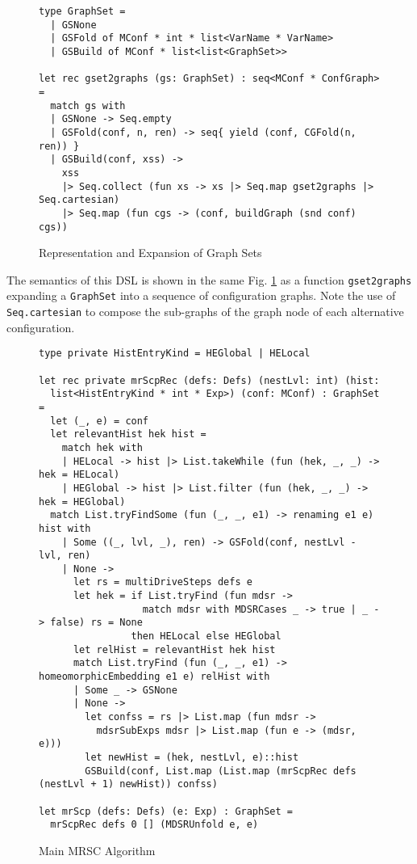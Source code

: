 \documentclass[submission,copyright,creativecommons]{eptcs}
\begin{document}
\begin{figure}
\begin{lstlisting}
type GraphSet =
  | GSNone
  | GSFold of MConf * int * list<VarName * VarName>
  | GSBuild of MConf * list<list<GraphSet>>

let rec gset2graphs (gs: GraphSet) : seq<MConf * ConfGraph> =
  match gs with
  | GSNone -> Seq.empty
  | GSFold(conf, n, ren) -> seq{ yield (conf, CGFold(n, ren)) }
  | GSBuild(conf, xss) ->
    xss
    |> Seq.collect (fun xs -> xs |> Seq.map gset2graphs |> Seq.cartesian)
    |> Seq.map (fun cgs -> (conf, buildGraph (snd conf) cgs))
\end{lstlisting}
\caption{Representation and Expansion of Graph Sets}
\label{fig:GraphSet}
\end{figure}

The semantics of this DSL is shown in the same Fig. \ref{fig:GraphSet} as
a function \verb|gset2graphs| expanding a \verb|GraphSet| into a sequence 
of configuration graphs.
Note the use of \verb|Seq.cartesian| to compose the sub-graphs of 
the graph node of each alternative configuration.

\begin{figure}
\begin{lstlisting}
type private HistEntryKind = HEGlobal | HELocal

let rec private mrScpRec (defs: Defs) (nestLvl: int) (hist: 
  list<HistEntryKind * int * Exp>) (conf: MConf) : GraphSet =
  let (_, e) = conf
  let relevantHist hek hist =
    match hek with
    | HELocal -> hist |> List.takeWhile (fun (hek, _, _) -> hek = HELocal)
    | HEGlobal -> hist |> List.filter (fun (hek, _, _) -> hek = HEGlobal)
  match List.tryFindSome (fun (_, _, e1) -> renaming e1 e) hist with
    | Some ((_, lvl, _), ren) -> GSFold(conf, nestLvl - lvl, ren)
    | None ->
      let rs = multiDriveSteps defs e
      let hek = if List.tryFind (fun mdsr -> 
                  match mdsr with MDSRCases _ -> true | _ -> false) rs = None
                then HELocal else HEGlobal
      let relHist = relevantHist hek hist
      match List.tryFind (fun (_, _, e1) -> homeomorphicEmbedding e1 e) relHist with
      | Some _ -> GSNone
      | None ->
        let confss = rs |> List.map (fun mdsr -> 
          mdsrSubExps mdsr |> List.map (fun e -> (mdsr, e)))
        let newHist = (hek, nestLvl, e)::hist
        GSBuild(conf, List.map (List.map (mrScpRec defs (nestLvl + 1) newHist)) confss)

let mrScp (defs: Defs) (e: Exp) : GraphSet =
  mrScpRec defs 0 [] (MDSRUnfold e, e)
\end{lstlisting}
\caption{Main MRSC Algorithm}
\label{fig:MRSCAlg}
\end{figure}
\end{document}
